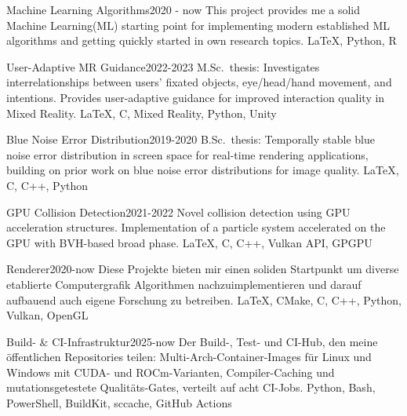 {\begin{projects}
        \ifcvshowprojml
        \project
    	{Machine Learning Algorithms}{2020 - now}
    	{}
    	{This project provides me a solid Machine Learning(ML) starting point for implementing modern established ML algorithms and getting quickly started in own research topics.}
    	{\LaTeX, Python, R}
        \fi

        \ifcvshowprojmr
        \project
    	{User-Adaptive MR Guidance}{2022-2023}
    	{}
    	{M.Sc.\ thesis: Investigates interrelationships between users' fixated objects, eye/head/hand movement, and intentions. Provides user-adaptive guidance for improved interaction quality in Mixed Reality.}
    	{\LaTeX, C\sharp, Mixed Reality, Python, Unity}
        \fi

        \ifcvshowprojbluenoise
        \project
    	{Blue Noise Error Distribution}{2019-2020}
    	{}
    	{B.Sc.\ thesis: Temporally stable blue noise error distribution in screen space for real-time rendering applications, building on prior work on blue noise error distributions for image quality.}
    	{\LaTeX, C, C++, Python}
        \fi

        \ifcvshowprojcollision
        \project
    	{GPU Collision Detection}{2021-2022}
    	{}
    	{Novel collision detection using GPU acceleration structures. Implementation of a particle system accelerated on the GPU with BVH-based broad phase.}
    	{\LaTeX, C, C++, Vulkan API, GPGPU}
        \fi

    \end{projects}
}{

    \begin{projects}
        \ifcvshowprojrenderer
        \project
    	{Renderer}{2020-now}
    	{}
    	{Diese Projekte bieten mir einen soliden Startpunkt um diverse etablierte Computergrafik Algorithmen nachzuimplementieren und darauf aufbauend auch eigene Forschung zu betreiben.}
    	{\LaTeX, CMake, C, C++, Python, Vulkan, OpenGL}
        \fi

        \ifcvshowprojhub
        \project
     	{Build- \& CI-Infrastruktur}{2025-now}
     	{}
     	{Der Build-, Test- und CI-Hub, den meine öffentlichen Repositories teilen: Multi-Arch-Container-Images für Linux und Windows mit CUDA- und ROCm-Varianten, Compiler-Caching und mutationsgetestete Qualitäts-Gates, verteilt auf acht CI-Jobs.}
     	{Python, Bash, PowerShell, BuildKit, sccache, GitHub Actions}
        \fi


\end{projects}}

